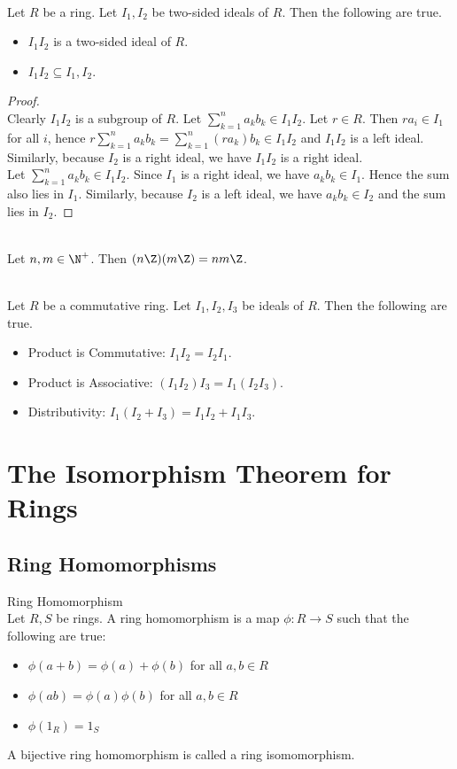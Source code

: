 \documentclass[a4paper]{article}
\begin{document}
\begin{lmm}{}{}\\
Let $R$ be a ring. Let $I_1,I_2$ be two-sided ideals of $R$. Then the following are true. 
\begin{itemize}
\item $I_1I_2$ is a two-sided ideal of $R$. 
\item $I_1I_2\subseteq I_1,I_2$. 
\end{itemize}
\begin{proof}\\
Clearly $I_1I_2$ is a subgroup of $R$. Let $\sum_{k=1}^na_kb_k\in I_1I_2$. Let $r\in R$. Then $ra_i\in I_1$ for all $i$, hence $r\sum_{k=1}^na_kb_k=\sum_{k=1}^n(ra_k)b_k\in I_1I_2$ and $I_1I_2$ is a left ideal. Similarly, because $I_2$ is a right ideal, we have $I_1I_2$ is a right ideal. \\

Let $\sum_{k=1}^na_kb_k\in I_1I_2$. Since $I_1$ is a right ideal, we have $a_kb_k\in I_1$. Hence the sum also lies in $I_1$. Similarly, because $I_2$ is a left ideal, we have $a_kb_k\in I_2$ and the sum lies in $I_2$. 
\end{proof}
\end{lmm}

\begin{eg}{}{}\\
Let $n,m\in\N^+$. Then $(n\Z)(m\Z)=nm\Z$. 
\end{eg}

\begin{lmm}{}{}\\
Let $R$ be a commutative ring. Let $I_1,I_2,I_3$ be ideals of $R$. Then the following are true. 
\begin{itemize}
\item Product is Commutative: $I_1I_2=I_2I_1$. 
\item Product is Associative: $(I_1I_2)I_3=I_1(I_2I_3)$. 
\item Distributivity: $I_1(I_2+I_3)=I_1I_2+I_1I_3$. 
\end{itemize}
\end{lmm}

\pagebreak
\section{The Isomorphism Theorem for Rings}
\subsection{Ring Homomorphisms}
\begin{defn}{Ring Homomorphism}{}\\
Let $R,S$ be rings. A ring homomorphism is a map $\phi:R\to S$ such that the following are true: 
\begin{itemize}
\item $\phi(a+b)=\phi(a)+\phi(b)$ for all $a,b\in R$
\item $\phi(ab)=\phi(a)\phi(b)$ for all $a,b\in R$
\item $\phi(1_R)=1_S$
\end{itemize}
A bijective ring homomorphism is called a ring isomomorphism. 
\end{defn}
\end{document}
